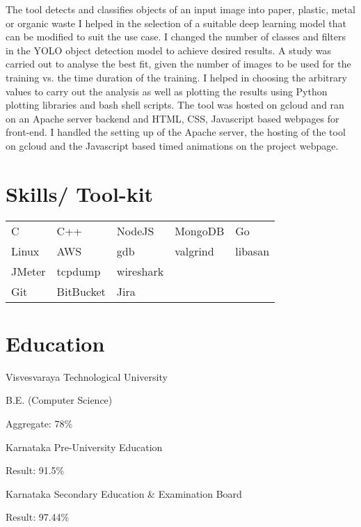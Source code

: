 \documentclass{../include/resume_v01}
\begin{document}
\workitems
{The tool detects and classifies objects of an input image into paper, plastic, metal or organic waste}
{I helped in the selection of a suitable deep learning model that can be modified to suit the use case. I changed the number of classes and filters in the YOLO object detection model to achieve desired results.}
{A study was carried out to analyse the best fit, given the number of images to be used for the training vs. the time duration of the training. I helped in choosing the arbitrary values to carry out the analysis as well as plotting the results using Python plotting libraries and bash shell scripts.}
{The tool was hosted on gcloud and ran on an Apache server backend and HTML, CSS, Javascript based webpages for front-end. I handled the setting up of the Apache server, the hosting of the tool on gcloud and the Javascript based timed animations on the project webpage.}

\section{Skills/ Tool-kit}
\begin{tabular}{l l l l l}
C & C++ & NodeJS & MongoDB  & Go  \\
Linux & AWS & gdb & valgrind & libasan \\
JMeter & tcpdump & wireshark \\
Git & BitBucket & Jira \\

\end{tabular}

\section{Education}
\par Visvesvaraya Technological University
\par B.E. (Computer Science)
\par Aggregate: 78\%

\par Karnataka Pre-University Education
\par Result: 91.5\%

\par Karnataka Secondary Education \& Examination Board
\par Result: 97.44\%
\end{document}
